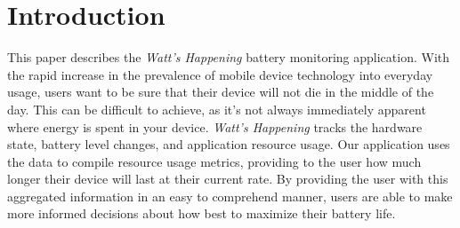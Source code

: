 \section{Introduction}
\label{sec:intro}
This paper describes the \emph{Watt's Happening} battery monitoring application. 
With the rapid increase in the prevalence of mobile device technology into everyday usage, users want to be sure that their device will not die in the middle of the day.
This can be difficult to achieve, as it's not always immediately apparent where energy is spent in your device.
\emph{Watt's Happening} tracks the hardware state, battery level changes, and application resource usage. 
Our application uses the data to compile resource usage metrics, providing  to the user  how much longer their device will last at their current rate.
By providing the user with this aggregated information in an easy to comprehend manner, users are able to make more informed decisions about how best to maximize their battery life.